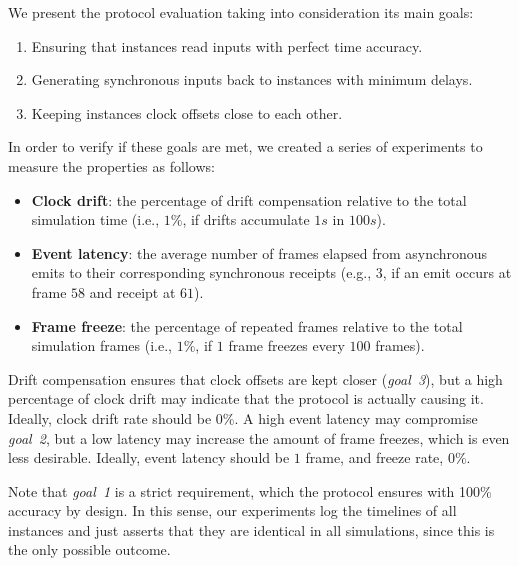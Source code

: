 \documentclass[sigplan,screen]{acmart}
\begin{document}
We present the protocol evaluation taking into consideration its main goals:
%
\begin{enumerate}
\item Ensuring that instances read inputs with perfect time accuracy.
\item Generating synchronous inputs back to instances with minimum delays.
\item Keeping instances clock offsets close to each other.
\end{enumerate}
%
In order to verify if these goals are met, we created a series of experiments
to measure the properties as follows:
%
\begin{itemize}
\item \textbf{Clock drift}:
    the percentage of drift compensation relative to the total simulation time
    (i.e., $1\%$, if drifts accumulate $1s$ in $100s$).
\item \textbf{Event latency}:
    the average number of frames elapsed from asynchronous emits to their
    corresponding synchronous receipts (e.g., $3$, if an emit occurs at frame
    $58$ and receipt at $61$).
\item \textbf{Frame freeze}:
    the percentage of repeated frames relative to the total simulation frames
    (i.e., $1\%$, if $1$ frame freezes every $100$ frames).

\end{itemize}
%
%
Drift compensation ensures that clock offsets are kept closer (\emph{goal~3}),
but a high percentage of clock drift may indicate that the protocol is actually
causing it.
Ideally, clock drift rate should be $0\%$.
%
A high event latency may compromise \emph{goal~2}, but a low latency may
increase the amount of frame freezes, which is even less desirable.
Ideally, event latency should be $1$ frame, and freeze rate, $0\%$.
%

%
Note that \emph{goal~1} is a strict requirement, which the protocol ensures
with 100\% accuracy by design.
In this sense, our experiments log the timelines of all instances and just
asserts that they are identical in all simulations, since this is the only
possible outcome.
\end{document}
